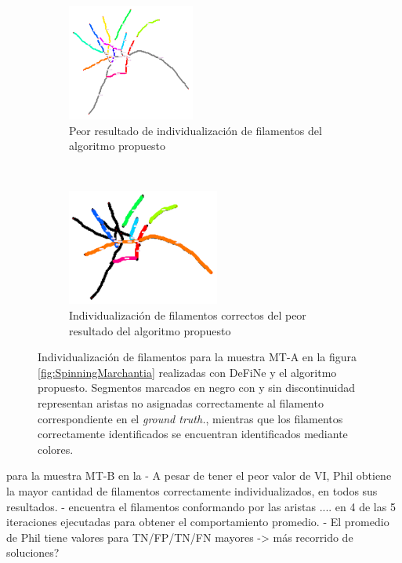 \begin{figure}[h!]
    \begin{subfigure}[t]{0.49\textwidth}
        \centering
        \includegraphics[height=1.5in]{resultImages/50-ROIs-Spinning-Marchantia-phil-s10-v05-nobg-antLabeled.png}
        \caption{Peor resultado de individualizaci\'on de filamentos del algoritmo propuesto}
        \label{SpinningMarchantiaResults-worstPhil}
    \end{subfigure}
    ~ 
    \begin{subfigure}[t]{0.49\textwidth}
        \centering
        \includegraphics[height=1.5in]{resultImages/50-ROIs-Spinning-Marchantia-phil-s10-v05-exactMatch-antLabeled-thick.png}
        \caption{Individualizaci\'on de filamentos correctos del peor resultado del algoritmo propuesto}
        \label{fig:SpinningMarchantiaResults-worstPhilExact}
    \end{subfigure}
    
    \caption{Individualizaci\'on  de filamentos para la muestra MT-A en la figura \ref{fig:SpinningMarchantia} realizadas con DeFiNe y el algoritmo propuesto. Segmentos marcados en negro con y sin discontinuidad representan aristas no asignadas correctamente al filamento correspondiente en el {\it ground truth.}, mientras que los filamentos correctamente identificados se encuentran identificados mediante colores.}
    \label{fig:SpinningMarchantiaResults}
\end{figure}

\clearpage
\newpage



para la muestra MT-B en la
- A pesar de tener el peor valor de VI, Phil obtiene la mayor cantidad de filamentos correctamente individualizados, en todos sus resultados. 
- encuentra el filamentos conformando por las aristas .... en 4 de las 5 iteraciones ejecutadas para obtener el comportamiento promedio. 
- El promedio de Phil tiene valores para TN/FP/TN/FN  mayores -> m\'as recorrido de soluciones?


